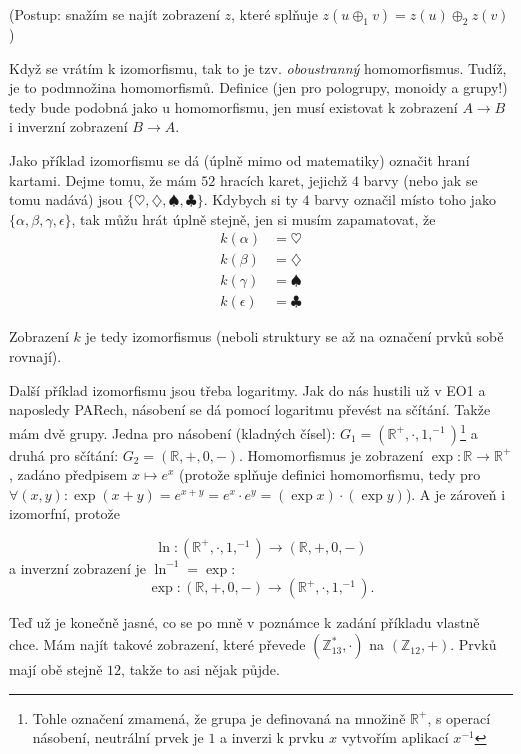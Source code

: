 \documentclass{article}
\begin{document}
(Postup: snažím se najít zobrazení $z$, které splňuje $z(u \oplus_1 v) = z(u) \oplus_2 z(v)$)

Když se vrátím k izomorfismu, tak to je tzv. \textit{oboustranný} homomorfismus. Tudíž, je to podmnožina homomorfismů. Definice (jen pro pologrupy, monoidy a grupy!) tedy bude podobná jako u homomorfismu, jen musí existovat k zobrazení $A \rightarrow B$ i inverzní zobrazení $B \rightarrow A$.

Jako příklad izomorfismu se dá (úplně mimo od matematiky) označit hraní kartami. Dejme tomu, že mám $52$ hracích karet, jejichž $4$ barvy (nebo jak se tomu nadává) jsou $\{\heartsuit, \diamondsuit, \spadesuit, \clubsuit\}$. Kdybych si ty $4$ barvy označil místo toho jako $\{\alpha, \beta, \gamma, \epsilon \}$, tak můžu hrát úplně stejně, jen si musím zapamatovat, že 
\begin{align*}
k(\alpha) &= \heartsuit \\
k(\beta) &= \diamondsuit \\
k(\gamma) &= \spadesuit \\
k(\epsilon) &= \clubsuit
\end{align*}

Zobrazení $k$ je tedy izomorfismus (neboli struktury se až na označení prvků sobě rovnají).

Další příklad izomorfismu jsou třeba logaritmy. Jak do nás hustili už v EO1 a naposledy PARech, násobení se dá pomocí logaritmu převést na sčítání. Takže mám dvě grupy. Jedna pro násobení (kladných čísel): $G_1 = (\mathbb{R}^+, \cdot , 1, ^{-1})$\footnote{Tohle označení zmamená, že grupa je definovaná na množině $\mathbb{R}^+$, s operací násobení, neutrální prvek je $1$ a inverzi k prvku $x$ vytvořím aplikací $x^{-1}$} a druhá pro sčítání: $G_2 = (\mathbb{R},+, 0,-)$. Homomorfismus je zobrazení $\exp : \mathbb{R} \rightarrow \mathbb{R}^+$, zadáno předpisem $x \mapsto e^x$ (protože splňuje definici homomorfismu, tedy pro $\forall(x, y): \exp(x + y) = e^{x+y} = e^x\cdot e^y = (\exp x) \cdot (\exp y)$). A je zároveň i izomorfní, protože

$$\ln: (\mathbb{R}^+, \cdot , 1, ^{-1}) \rightarrow (\mathbb{R},+, 0,-)$$
a inverzní zobrazení je $\ln^{-1} = \exp$:
$$\exp: (\mathbb{R},+, 0,-) \rightarrow (\mathbb{R}^+, \cdot , 1, ^{-1}).$$

Teď už je konečně jasné, co se po mně v poznámce k zadání příkladu vlastně chce. Mám najít takové zobrazení, které převede $(\mathbb{Z}_{13}^{*},\cdot)$ na $(\mathbb{Z}_{12},+)$. Prvků mají obě stejně $12$, takže to asi nějak půjde.
\end{document}
